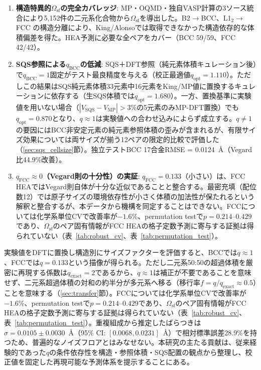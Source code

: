 \documentclass[5p,10pt]{elsarticle}
\begin{document}
\begin{enumerate}
  \item \textbf{構造特異的$\Omega_\text{sf}$の完全カバレッジ}:
    MP・OQMD・独自VASP計算の3ソース統合により5,152件の二元系化合物から$\Omega_\text{sf}$を導出した。B2$\to$BCC、L1$_2$$\to$FCC の構造分離により、King/Alonsoでは取得できなかった構造依存的な体積偏差を得た。HEA予測に必要な全ペアをカバー（BCC 59/59、FCC 42/42）。

  \item \textbf{SQS参照による$q_\text{BCC}$の低減}:
    SQS＋DFT参照（純元素体積キュレーション後）で$q_\text{BCC} = 1$固定がテスト最良精度を与える（校正最適値$q_\text{opt} = 1.110$）。ただしこの結果はSQS純元素体積33元素中16元素をKing/MP値に置換するキュレーションに依存する（生SQS体積では$q_\text{opt} = 1.680$）。一方、置換基準に実験値を用いない場合（$|V_\text{SQS}-V_\text{MP}|>3\%$の5元素のみMP-DFT置換）でも$q_\text{opt} = 0.870$となり、$q \approx 1$は実験値への合わせ込みによらず成立する。$q \neq 1$の要因にはBCC非安定元素の純元素参照体積の歪みが含まれるが、有限サイズ効果については両サイズが揃う12ペアの限定的比較で評価した（\ref{sec:sqs_cellsize}節）。独立テストBCC 17合金RMSE = 0.0124~\AA{}（Vegard比44.9\%改善）。

  \item \textbf{$q_\text{FCC} \approx 0$（Vegard則の十分性）の実証}:
    $q_\text{FCC} = 0.133$（小さい）は、FCC HEAではVegard則自体が十分な近似であることと整合する。最密充填（配位数12）では原子サイズの環境依存性が小さく体積の加法性が保たれるという解釈と整合するが、本データから機構を同定することはできない。FCCについては化学系単位CVで改善率が$-1.6\%$、permutation testで$p = 0.214$--$0.429$であり、$\Omega_\text{sf}$のペア固有情報がFCC HEAの格子定数予測に寄与する証拠は得られていない（表~\ref{tab:robust_cv}、表~\ref{tab:permutation_test}）。
\end{enumerate}

実験値をDFTに置換し構造別にサイズファクターを評価すると、BCCでは$q \approx 1$、FCCでは$q = 0.133$という描像が得られる。ただし二元系50:50の超過体積を厳密に再現する係数は$q_\text{exact} = 2$であるから、$q \approx 1$は補正が不要であることを意味せず、二元系超過体積の対和の約半分が多元系へ移る（移行率$f = q/q_\text{exact} \approx 0.5$）ことを意味する（\ref{sec:transfer}節）。FCCについては化学系単位CVで改善率が$-1.6\%$、permutation testで$p = 0.214$--$0.429$であり、$\Omega_\text{sf}$のペア固有情報がFCC HEAの格子定数予測に寄与する証拠は得られていない（表~\ref{tab:robust_cv}、表~\ref{tab:permutation_test}）。重複組成から推定したばらつきは$\sigma = 0.0105 \pm 0.0030$~\AA{}（95\% CI: $[0.0068, 0.0231]$~\AA{}）で相対標準誤差28.9\%を持つため、普遍的なノイズフロアとはみなせない。本研究の主たる貢献は、従来経験的であった$q$の条件依存性を構造・参照体積・SQS配置の観点から整理し、校正値を固定した再現可能な予測体系を提示することにある。
\end{document}
